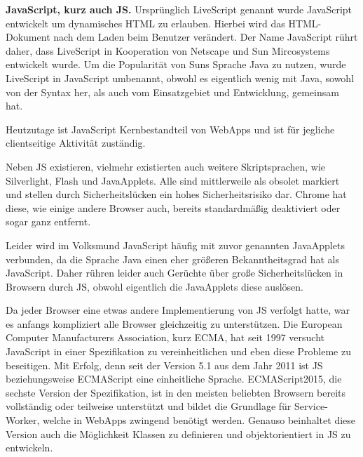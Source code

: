 \documentclass[a4paper,12pt,ngerman,listof=numbered]{scrartcl}      %
\let\oldcite\cite
\renewcommand{\cite}[1]{\textsuperscript{\oldcite{#1}}}
\newcommand{\spacer}{\par\bigskip\noindent}
\begin{document}
	\spacer\textbf{JavaScript, kurz auch JS.} Ursprünglich LiveScript genannt wurde JavaScript entwickelt um dynamisches HTML zu erlauben. Hierbei wird das HTML-Dokument nach dem Laden beim Benutzer verändert. Der Name JavaScript rührt daher, dass LiveScript in Kooperation von Netscape und Sun Mircosystems entwickelt wurde. Um die Popularität von Suns Sprache Java zu nutzen, wurde LiveScript in Java\-Script umbenannt, obwohl es eigentlich wenig mit Java, sowohl von der Syntax her, als auch vom Einsatzgebiet und Entwicklung, gemeinsam hat. \cite{jsWiki}\par
	Heutzutage ist JavaScript Kernbestandteil von WebApps und ist für jegliche clientseitige Aktivität zuständig.\par
	Neben JS existieren, vielmehr existierten auch weitere Skriptsprachen, wie Silverlight, Flash und JavaApplets. Alle sind mittlerweile als obsolet markiert und stellen durch Sicherheitslücken ein hohes Sicherheitsrisiko dar.\cite{flashPlayer} Chrome hat diese, wie einige andere Browser auch, bereits standardmäßig deaktiviert oder sogar ganz entfernt.\cite{chromeNoFlash}\par
	Leider wird im Volksmund JavaScript häufig mit zuvor genannten JavaApplets verbunden, da die Sprache Java einen eher größeren Bekanntheitsgrad hat als JavaScript. Daher rühren leider auch Gerüchte über große Sicherheitslücken in Browsern durch JS, obwohl eigentlich die JavaApplets diese auslösen.\par
	Da jeder Browser eine etwas andere Implementierung von JS verfolgt hatte, war es anfangs kompliziert alle Browser gleichzeitig zu unterstützen. Die European Computer Manufacturers Association, kurz ECMA, hat seit 1997 versucht Java\-Script in einer Spezifikation zu vereinheitlichen und eben diese Probleme zu beseitigen. Mit Erfolg, denn seit der Version 5.1 aus dem Jahr 2011 ist JS beziehungsweise ECMAScript eine einheitliche Sprache. ECMAScript2015, die sechste Version der Spezifikation, ist in den meisten beliebten Browsern bereits vollständig oder teilweise unterstützt und bildet die Grundlage für Service-Worker, welche in WebApps zwingend benötigt werden. Genauso beinhaltet diese Version auch die Möglichkeit Klassen zu definieren und objektorientiert in JS zu entwickeln.\cite{wikiECMA} \par
	
\end{document}
